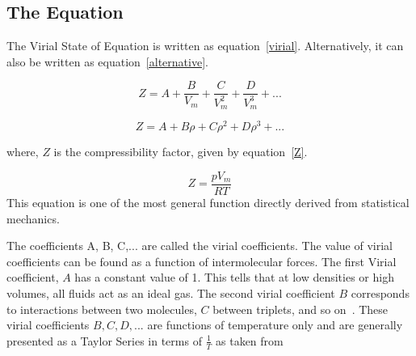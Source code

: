 \documentclass[12pt]{article}
\begin{document}
\subsection{The Equation}
The Virial State of Equation is written as equation~\ref{virial}. Alternatively, it can also be written as equation~\ref{alternative}.

\begin{equation}
	Z = A + \frac{B}{V_m} + \frac{C}{V_m^2} + \frac{D}{V_m^3} + . . .
	\label{virial}
\end{equation}

\begin{equation}
	Z = A + B\rho + C{\rho}^2 + D{\rho}^3 + . . .
	\label{alternative}
\end{equation}

where, $Z$ is the compressibility factor, given by equation~\ref{Z}.

\begin{equation}
	Z = \frac {pV_m} {RT}
	\label{Z}
\end{equation}
This equation is one of the most general function directly derived from statistical mechanics.

The coefficients A, B, C,... are called the virial coefficients. The value of virial coefficients can be found as a function of intermolecular forces. The first Virial coefficient, $A$ has a constant value of 1. This tells that at low densities or high volumes, all fluids act as an ideal gas. The second virial coefficient $B$ corresponds to interactions between two molecules, $C$ between triplets, and so on~\cite{enwiki:1153405425}. These virial coefficients $B,C,D,...$ are functions of temperature only and are generally presented as a Taylor Series in terms of $\frac{1}{T}$ as taken from~\cite{enwiki:1141609317}



\end{document}
